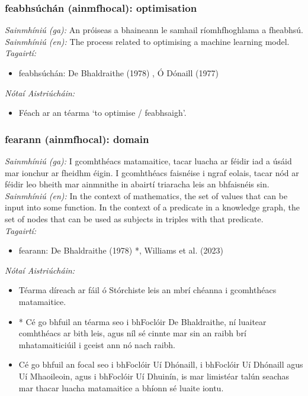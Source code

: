 \subsubsection*{feabhsúchán (ainmfhocal): optimisation}
 \noindent \textit{Sainmhíniú (ga):} An próiseas a bhaineann le samhail ríomhfhoghlama a fheabhsú.
\\
 \noindent \textit{Sainmhíniú (en):} The process related to optimising a machine learning model.
\\
 \noindent \textit{Tagairtí:}
\begin{itemize}
	\item feabhsúchán: De Bhaldraithe (1978) \cite{de-bhaldraithe}, Ó Dónaill (1977) \cite{odonaill}
\end{itemize}

 \noindent \textit{Nótaí Aistriúcháin:}
\begin{itemize}
	\item Féach ar an téarma `to optimise / feabhsaigh'.
\end{itemize}


\subsubsection*{fearann (ainmfhocal): domain}
 \noindent \textit{Sainmhíniú (ga):} I gcomhthéacs matamaitice, tacar luacha ar féidir iad a úsáid mar ionchur ar fheidhm éigin. I gcomhthéacs faisnéise i ngraf eolais, tacar nód ar féidir leo bheith mar ainmnithe in abairtí triaracha leis an bhfaisnéis sin.
\\
 \noindent \textit{Sainmhíniú (en):} In the context of mathematics, the set of values that can be input into some function. In the context of a predicate in a knowledge graph, the set of nodes that can be used as subjects in triples with that predicate.
\\
 \noindent \textit{Tagairtí:}
\begin{itemize}
	\item fearann: De Bhaldraithe (1978) \cite{de-bhaldraithe}*, Williams et al. (2023) \cite{storchiste}
\end{itemize}

 \noindent \textit{Nótaí Aistriúcháin:}
\begin{itemize}
	\item Téarma díreach ar fáil ó Stórchiste leis an mbrí chéanna i gcomhthéacs matamaitice.
	\item * Cé go bhfuil an téarma seo i bhFoclóir De Bhaldraithe, ní luaitear comhthéacs ar bith leis, agus níl sé cinnte mar sin an raibh brí mhatamaiticiúil i gceist ann nó nach raibh.
	\item Cé go bhfuil an focal seo i bhFoclóir Uí Dhónaill, i bhFoclóir Uí Dhónaill agus Uí Mhaoileoin, agus i bhFoclóir Uí Dhuinín, is mar limistéar talún seachas mar thacar luacha matamaitice a bhíonn sé luaite iontu.
\end{itemize}


